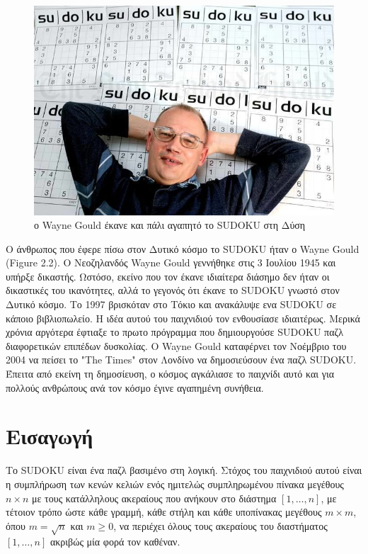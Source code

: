 \documentclass[12pt]{book}
\theoremstyle{definition}
\begin{document}
\begin{figure}[h]
	\centering
	\includegraphics[scale=0.45]{Figures/WayneGould.jpg}
	\caption{ο Wayne Gould έκανε και πάλι αγαπητό το SUDOKU στη Δύση}
\end{figure}

Ο άνθρωπος που έφερε πίσω στον Δυτικό κόσμο το SUDOKU ήταν ο Wayne Gould (Figure 2.2). Ο Νεοζηλανδός Wayne Gould γεννήθηκε στις 3 Ιουλίου 1945 και υπήρξε δικαστής. Ωστόσο, εκείνο που τον έκανε ιδιαίτερα διάσημο δεν ήταν οι δικαστικές του ικανότητες, αλλά το γεγονός ότι έκανε το SUDOKU γνωστό στον Δυτικό κόσμο. Το 1997 βρισκόταν στο Τόκιο και ανακάλυψε ενα SUDOKU σε κάποιο βιβλιοπωλείο. Η ιδέα αυτού του παιχνιδιού τον ενθουσίασε ιδιαιτέρως. Μερικά χρόνια αργότερα έφτιαξε το πρωτο πρόγραμμα που δημιουργούσε SUDOKU παζλ διαφορετικών επιπέδων δυσκολίας. Ο Wayne Gould καταφέρνει τον Νοέμβριο του 2004 να πείσει το "The Times" στον Λονδίνο να δημοσιεύσουν ένα παζλ SUDOKU. Έπειτα από εκείνη τη δημοσίευση, ο κόσμος αγκάλιασε το παιχνίδι αυτό και για πολλούς ανθρώπους ανά τον κόσμο έγινε αγαπημένη συνήθεια.

\chapter{Εισαγωγή}

Το SUDOKU είναι ένα παζλ βασιμένο στη λογική. Στόχος του παιχνιδιού αυτού είναι η συμπλήρωση των
κενών κελιών ενός ημιτελώς συμπληρωμένου πίνακα μεγέθους
\(n \times n\) με τους κατάλληλους ακεραίους που ανήκουν στο διάστημα \(\left[1,\dots,n \right]\), με τέτοιον τρόπο ώστε κάθε γραμμή, κάθε στήλη και κάθε υποπίνακας μεγέθους \(m \times m\), όπου \(m = \sqrt{n} \) και \( m \ge 0\), να περιέχει όλους τους ακεραίους του διαστήματος  \(\left[1,\dots,n \right]\) ακριβώς μία φορά τον καθέναν. \par
\end{document}
